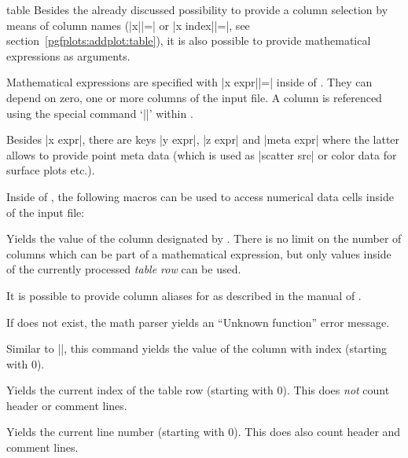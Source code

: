 \begin{addplotoperation}[]{table}{}
\label{pgfplots:addplot:table:expr}
	Besides the already discussed possibility to provide a column selection by means of column names (|x||=| or |x index||=|, see section~\ref{pgfplots:addplot:table}), it is also possible to provide mathematical expressions as arguments.

	Mathematical expressions are specified with |x expr||=| inside of . They can depend on zero, one or more columns of the input file. A column is referenced using the special command `|\thisrow|' within .
\begin{codeexample}[vbox]

\end{codeexample}

	Besides |x expr|, there are keys |y expr|, |z expr| and |meta expr| where the latter allows to provide point meta data (which is used as |scatter src| or color data for surface plots etc.).

	Inside of , the following macros can be used to access numerical data cells inside of the input file:

	\begin{command}{\thisrow{}}
		Yields the value of the column designated by . There is no limit on the number of columns which can be part of a mathematical expression, but only values inside of the currently processed \emph{table row} can be used.
		
		It is possible to provide column aliases for  as described in the manual of \PGFPlotstable. 

		If  does not exist, the math parser yields an ``Unknown function'' error message.
	\end{command}
	\begin{command}{\thisrowno{}}
		Similar to |\thisrow|, this command yields the value of the column with index  (starting with $0$). 
	\end{command}
	\begin{command}{\coordindex}
		Yields the current index of the table row (starting with $0$). This does \emph{not} count header or comment lines.		
	\end{command}
	\begin{command}{\lineno}
		Yields the current line number (starting with $0$). This does also count header and comment lines.
	\end{command}


\end{addplotoperation}
